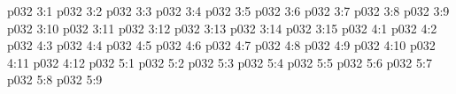 \vs p032 3:1 
\vs p032 3:2 
\vs p032 3:3 
\vs p032 3:4 \pc 
\vs p032 3:5 
\vs p032 3:6 
\vs p032 3:7 \pc 
\vs p032 3:8 \pc 
\vs p032 3:9 
\vs p032 3:10 
\vs p032 3:11 
\vs p032 3:12 
\vs p032 3:13 
\vs p032 3:14 
\vs p032 3:15 
\vs p032 4:1 
\vs p032 4:2 
\vs p032 4:3 \pc 
\vs p032 4:4 
\vs p032 4:5 \pc 
\vs p032 4:6 \pc 
\vs p032 4:7 
\vs p032 4:8 
\vs p032 4:9 \pc 
\vs p032 4:10 \pc 
\vs p032 4:11 
\vs p032 4:12 
\vs p032 5:1 
\vs p032 5:2 
\vs p032 5:3 \pc 
\vs p032 5:4 
\vs p032 5:5 
\vs p032 5:6 
\vs p032 5:7 \pc 
\vs p032 5:8 
\vsetoff
\vs p032 5:9 
\quizlink
